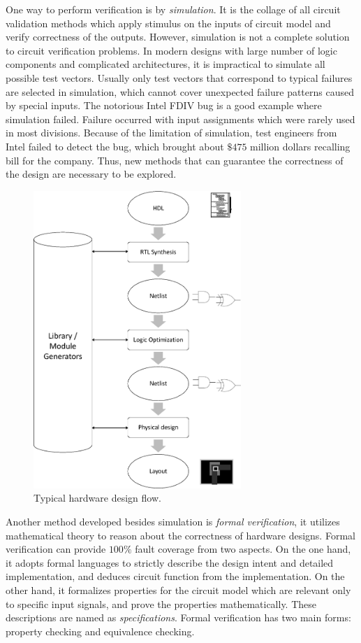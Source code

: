 One way to perform verification is by {\it simulation}. It is the collage of all circuit validation 
methods which apply stimulus on the inputs of circuit model and verify correctness of the outputs.
However, simulation is not a complete solution to circuit verification problems. In modern designs with 
large number of logic components and complicated architectures, it is impractical to simulate all possible 
test vectors. Usually only test vectors that correspond to typical failures are selected in simulation, which 
cannot cover unexpected failure patterns caused by special inputs. The notorious Intel FDIV bug \cite{nicely:FDIV}
is a good example where simulation failed. Failure occurred with input assignments which were rarely used in most divisions. Because of the limitation of simulation,  
test engineers from Intel failed to detect the bug,  which brought about $\$475$ million dollars recalling bill
for the company. Thus,  new methods that can guarantee the correctness of the design are necessary to be explored.

{
\begin{figure}[h]
\centerline{
\includegraphics[width=0.7\textwidth]{newfig/designflow.eps}
}
\caption{Typical hardware design flow.}
\label{fig:designflow}
\end{figure}
}

Another method developed besides simulation is \emph{formal verification}, it utilizes 
mathematical theory to reason about the correctness of hardware designs.
Formal verification can provide $100\%$ fault coverage from two aspects. On the one hand,  
it adopts formal languages to strictly describe the design intent and detailed implementation, 
and deduces circuit function from the implementation.
On the other hand,  it formalizes properties
for the circuit model which are relevant only to specific input signals,  and prove the properties mathematically. 
These descriptions are named as {\it specifications}.
Formal verification has two main forms: property checking and equivalence 
checking. 

